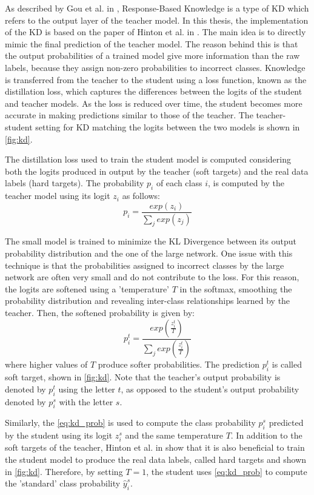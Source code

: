 As described by Gou et al. in \cite{gou2021knowledge},
Response-Based Knowledge is a type of KD which refers to the output layer of the teacher model.
In this thesis, the implementation of the KD is based on the paper of Hinton et al. in \cite{hinton2015distilling}.
The main idea is to directly mimic the final prediction
of the teacher model.
The reason behind this is that the output probabilities of a trained model give more information than the raw labels, because they assign non-zero probabilities to incorrect classes.
Knowledge is transferred from the teacher to the student using a loss function, known as the distillation loss, which captures the differences between the logits of the student and teacher models.
As the loss is reduced over time, the student becomes more accurate in making predictions similar to those of the teacher.
The teacher-student setting for KD matching the logits between the two models is shown in \autoref{fig:kd}.

The distillation loss used to train the student model is computed considering both the logits produced in output by the teacher (soft targets) and the real data labels (hard targets).
The probability $p_i$ of each class $i$, is computed by the teacher model using its logit $z_i$ as follows:
\begin{equation}
    p_i = \frac{exp(z_i)}{\sum_j exp(z_j)}
\end{equation}

The small model is trained to minimize the KL Divergence between its output probability distribution and the one of the large network.
One issue with this technique is that the probabilities assigned to incorrect classes by the large network are often very small and do not contribute to the loss.
For this reason, the logits are softened using a 'temperature' $T$ in the softmax, smoothing the probability distribution and revealing inter-class relationships learned by the teacher.
Then, the softened probability is given by:
\begin{equation}\label{eq:kd_prob}
    p_i^t = \frac{exp(\frac{z_i^t}{T})}{\sum_j exp(\frac{z_i^t}{T})}
\end{equation}
where higher values of $T$ produce softer probabilities. The prediction $p_i^t$ is called soft target, shown in \autoref{fig:kd}. 
Note that the teacher's output probability is denoted by $p_i^t$ using the letter $t$, as opposed to the student's output probability denoted by $p_i^s$ with the letter $s$.

Similarly, the \autoref{eq:kd_prob} is used to compute the class probability $p_i^s$ predicted by the student using its logit $z_i^s$ and the same temperature $T$.
In addition to the soft targets of the teacher, Hinton et al. in \cite{hinton2015distilling} show that it is also beneficial to train the student model to produce the real data labels, called hard targets and shown in \autoref{fig:kd}.
Therefore, by setting $T = 1$, the student uses \autoref{eq:kd_prob} to compute the 'standard' class probability $\hat{y}_i^s$.

